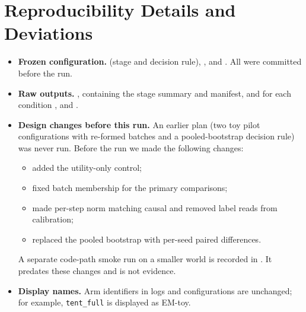 \section{Reproducibility Details and Deviations}
\label{app:repro}
{\raggedright
\begin{itemize}
\item \textbf{Frozen configuration.}  (stage and
decision rule), ,
 and .
All were committed before the run.
\item \textbf{Raw outputs.} , containing the stage summary and
manifest, and for each condition ,  and .
\item \textbf{Design changes before this run.} An earlier plan (two toy pilot configurations with re-formed
batches and a pooled-bootstrap decision rule) was never run. Before the run we made the following changes:
\begin{itemize}
\item added the utility-only control;
\item fixed batch membership for the primary comparisons;
\item made per-step norm matching causal and removed label reads from calibration;
\item replaced the pooled bootstrap with per-seed paired differences.
\end{itemize}
A separate code-path smoke run on a smaller world is recorded in . It
predates these changes and is not evidence.
\item \textbf{Display names.} Arm identifiers in logs and configurations are unchanged; for example,
\texttt{tent\_full} is displayed as EM-toy.
\end{itemize}
}

